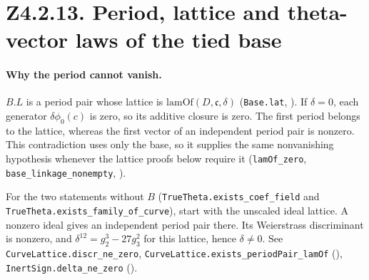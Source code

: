 \section*{Z4.2.13. Period, lattice and theta-vector laws of the tied base}

\paragraph{Why the period cannot vanish.}\label{r14:period}
$B.L$ is a period pair whose lattice is $\mathrm{lamOf}(D,\mathfrak c,\delta)$
(\nolinkurl{Base.lat}, ).
If $\delta=0$, each generator $\delta\phi_0(c)$ is zero, so its additive
closure is zero. The first period belongs to the lattice, whereas the first
vector of an independent period pair is nonzero. This contradiction uses
only the base, so it supplies the same nonvanishing hypothesis whenever
the lattice proofs below require it
(\nolinkurl{lamOf_zero}, \nolinkurl{base_linkage_nonempty},
).

For the two statements without $B$ (\nolinkurl{TrueTheta.exists_coef_field}
and \nolinkurl{TrueTheta.exists_family_of_curve}), start with the unscaled
ideal lattice. A nonzero ideal gives an independent period pair there.
Its Weierstrass discriminant is nonzero, and
$\delta^{12}=g_2^3-27g_3^2$ for this lattice, hence $\delta\ne0$.
See \nolinkurl{CurveLattice.discr_ne_zero},
\nolinkurl{CurveLattice.exists_periodPair_lamOf}
(),
\nolinkurl{InertSign.delta_ne_zero}
().

